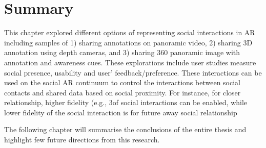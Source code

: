 \section{Summary}

This chapter explored different options of representing social interactions in AR including samples of 1) sharing annotations on panoramic video, 2) sharing 3D annotation using depth cameras, and 3) sharing 360 panoramic image with annotation and awareness cues. These explorations include user studies measure social presence, usability and user' feedback/preference. These interactions can be used on the social AR continuum to control the interactions between social contacts and shared data based on social proximity. For instance, for closer relationship, higher fidelity (e.g., 3of social interactions can be enabled, while lower fidelity of the social interaction is for future away social relationship

The following chapter will summarise the conclusions of the entire thesis and highlight few future directions from this research.
